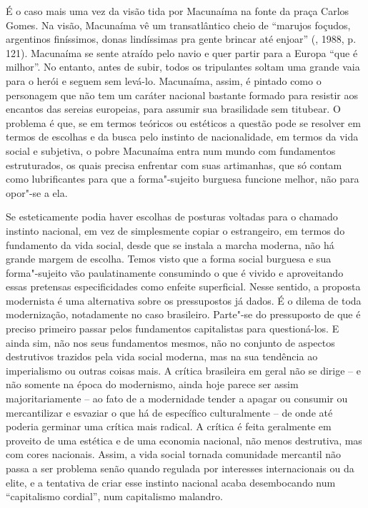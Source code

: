 É o caso mais uma vez da visão tida por Macunaíma na fonte da praça
Carlos Gomes. Na visão, Macunaíma vê um transatlântico cheio de
``marujos foçudos, argentinos finíssimos, donas lindíssimas pra gente
brincar até enjoar'' (, 1988, p. 121). Macunaíma se sente atraído
pelo navio e quer partir para a Europa ``que é milhor''. No entanto,
antes de subir, todos os tripulantes soltam uma grande vaia para o herói
e seguem sem levá-lo. Macunaíma, assim, é pintado como o personagem que
não tem um caráter nacional bastante formado para resistir aos encantos
das sereias europeias, para assumir sua brasilidade sem titubear. O problema é que,
se em termos teóricos ou estéticos a questão pode se resolver em termos
de escolhas e da busca pelo instinto de nacionalidade, em termos da vida
social e subjetiva, o pobre Macunaíma entra num mundo com fundamentos estruturados,
os quais precisa enfrentar com suas artimanhas, que só contam como
lubrificantes para que a forma"-sujeito burguesa funcione melhor, não
para opor"-se a ela.

Se esteticamente podia haver escolhas de posturas voltadas para o
chamado instinto nacional, em vez de simplesmente copiar o estrangeiro,
em termos do fundamento da vida social, desde que se instala a marcha
moderna, não há grande margem de escolha. Temos visto que a forma social
burguesa e sua forma"-sujeito vão paulatinamente consumindo o que é
vivido e aproveitando essas pretensas especificidades como enfeite
superficial. Nesse sentido, a proposta modernista é uma alternativa
sobre os pressupostos já dados. É o dilema de toda modernização,
notadamente no caso brasileiro. Parte"-se do pressuposto
de que é preciso primeiro passar pelos
fundamentos capitalistas para questioná-los. E ainda sim, não nos seus
fundamentos mesmos, não no conjunto de aspectos destrutivos trazidos
pela vida social moderna, mas na sua tendência ao imperialismo ou outras
coisas mais. A crítica brasileira em geral não se dirige -- e não
somente na época do modernismo, ainda hoje parece ser assim
majoritariamente -- ao fato de a modernidade tender a apagar ou consumir
ou mercantilizar e esvaziar o que há de específico culturalmente -- de
onde até poderia germinar uma crítica mais radical. A crítica é feita
geralmente em proveito de uma estética e de uma economia nacional, não
menos destrutiva, mas com cores nacionais. Assim, a vida social tornada
comunidade mercantil não passa a ser problema senão quando regulada por
interesses internacionais ou da elite, e a tentativa de criar esse
instinto nacional acaba desembocando num ``capitalismo cordial'', num
capitalismo malandro.

